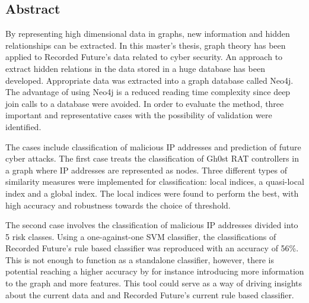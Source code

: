 
\noindent
\begin{comment}
\thesistitle\\
\thesissubtitle\\
\whatthisis\\
\\
\large{%
    Henrik Adolfsson\\
	Josephine Cuellar Andersson\\
}\\
\\
\large{%
	\whereandwhen
}
\vfill
\end{comment}

\begin{center}
    \section*{Abstract}
\end{center}

By representing high dimensional data in graphs, new information and hidden relationships can be extracted. In this master's thesis, graph theory has been applied to Recorded Future's data related to cyber security. An approach to extract hidden relations in the data stored in a huge database has been developed. Appropriate data was extracted into a graph database called Neo4j. The advantage of using Neo4j is a reduced reading time complexity since deep join calls to a database were avoided. In order to evaluate the method, three important and representative cases with the possibility of validation were identified. 

The cases include classification of malicious IP addresses and prediction of future cyber attacks. The first case treats the classification of Gh0st RAT controllers in a graph where IP addresses are represented as nodes. Three different types of similarity measures were implemented for classification: local indices, a quasi-local index and a global index. The local indices were found to perform the best, with high accuracy and robustness towards the choice of threshold.

The second case involves the classification of malicious IP addresses divided into 5 risk classes. Using a one-against-one SVM classifier, the classifications of Recorded Future's rule based classifier was reproduced with an accuracy of 56\%. This is not enough to function as a standalone classifier, however, there is potential reaching a higher accuracy by for instance introducing more information to the graph and more features. This tool could serve as a way of driving insights about the current data and and Recorded Future's current rule based classifier.

